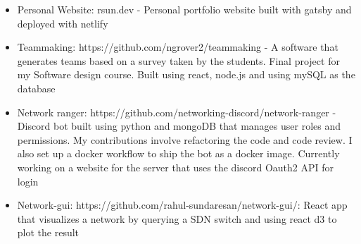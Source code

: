
\divider
{}

\begin{itemize}
    \item Personal Website: rsun.dev - Personal portfolio website built with gatsby and deployed with netlify
    \item Teammaking: https://github.com/ngrover2/teammaking - A software that generates teams based on a survey taken by the students. Final project for my Software design course. Built using react, node.js and using mySQL as the database
    \item Network ranger:  https://github.com/networking-discord/network-ranger - 
    Discord bot built using python and mongoDB that manages user roles and permissions. My contributions involve refactoring the code and code review. I also set up a docker workflow to ship the bot as a docker image. Currently working on a website for the server that uses the discord Oauth2 API for login
    \item Network-gui: https://github.com/rahul-sundaresan/network-gui/: React app that visualizes a network by querying a SDN switch and using react d3 to plot the result 
\end{itemize}

    \cvtag{\LaTeX}











